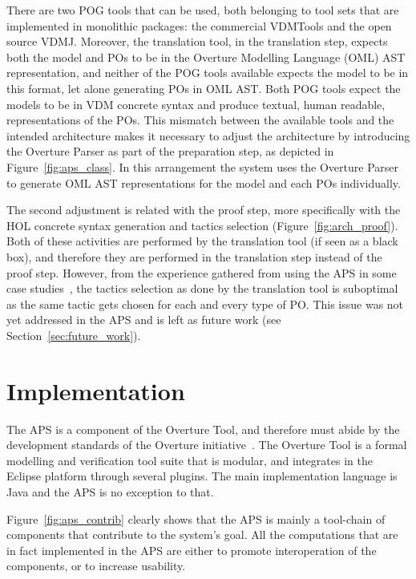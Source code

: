 \documentclass[]{article}
\begin{document}
There are two POG tools that can be used, both belonging to tool sets that are implemented in monolithic packages: the commercial VDMTools and the open source VDMJ.
Moreover, the translation tool, in the translation step, expects both the model and POs to be in the Overture Modelling Language (OML) AST representation, and neither of the POG tools available expects the model to be in this format, let alone generating POs in OML AST.
Both POG tools expect the models to be in VDM concrete syntax and produce textual, human readable, representations of the POs.
This mismatch between the available tools and the intended architecture makes it necessary to adjust the architecture by introducing the Overture Parser as part of the preparation step, as depicted in Figure~\ref{fig:aps_class}.
In this arrangement the system uses the Overture Parser to generate OML AST representations for the model and each POs individually.

The second adjustment is related with the proof step, more specifically with the HOL concrete syntax generation and tactics selection (Figure~\ref{fig:arch_proof}).
Both of these activities are performed by the translation tool (if seen as a black box), and therefore they are performed in the translation step instead of the proof step.
However, from the experience gathered from using the APS in some case studies~\cite{FerreiraSO2008,Ferreira2009,FerreiraSBMF09}, the tactics selection as done by the translation tool is suboptimal as the same tactic gets chosen for each and every type of PO.
This issue was not yet addressed in the APS and is left as future work (see Section~\ref{sec:future_work}).

\section{Implementation}
\label{sec:implementation}

The APS is a component of the Overture Tool, and therefore must abide by the development standards of the Overture initiative~\cite{LarsenBFL08}.
The Overture Tool is a formal modelling and verification tool suite that is modular, and integrates in the Eclipse platform through several plugins.
The main implementation language is Java and the APS is no exception to that.

Figure~\ref{fig:aps_contrib} clearly shows that the APS is mainly a tool-chain of components that contribute to the system's goal.
All the computations that are in fact implemented in the APS are either to promote interoperation of the components, or to increase usability.
\end{document}
